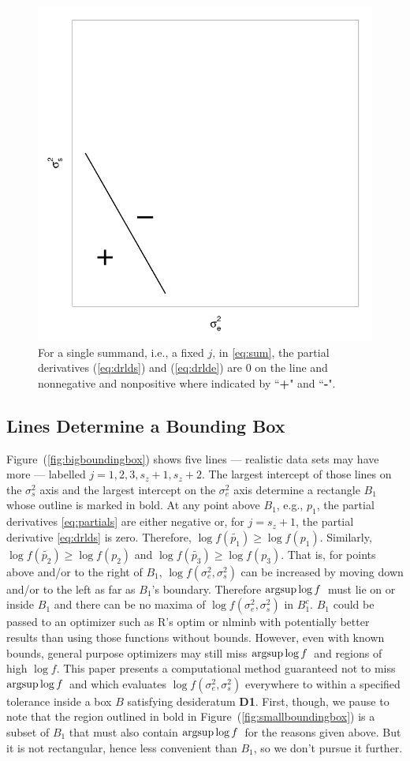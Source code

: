 \documentclass{report}
\newcommand{\textcompute}{\textsf}
\newcommand{\R}{\textcompute{R}\xspace}
\newcommand{\RL}{f}
\newcommand{\logRL}{\log\RL}
\newcommand{\sigssq}{\sigma_s^2}
\newcommand{\sigesq}{\sigma_e^2}
\newcommand{\logRLss}{\logRL(\sigesq,\sigssq)}
\newcommand{\mrle}{$\argsup\log f$}
\newcommand{\argsup}{\operatornamewithlimits{argsup}}
\begin{document}
\begin{figure}[h]
	\centering
	\includegraphics[width=.5\linewidth]{figs/oneline.pdf}
	\caption{For a single summand, i.e., a fixed $j$, in \eqref{eq:sum},
	              the partial derivatives (\ref{eq:drlds}) and (\ref{eq:drlde})
	              are 0 on the line and nonnegative and nonpositive
	              where indicated by ``\textbf{+}" and ``\textbf{-}".}
	\label{fig:oneline}
\end{figure}

\subsection{Lines Determine a Bounding Box}
\label{sec:boundingbox}

Figure~(\ref{fig:bigboundingbox}) shows five lines --- realistic data sets may have more --- labelled $j=1, 2, 3, s_z+1, s_z+2$.  The largest intercept of those lines on the $\sigssq$ axis and the largest intercept on the $\sigesq$ axis determine a rectangle $B_1$ whose outline is marked in bold.  At any point above $B_1$, e.g., $p_1$, the partial derivatives \eqref{eq:partials} are either negative or, for $j=s_z+1$, the partial derivative \eqref{eq:drlds} is zero.  Therefore, $\logRL(\widetilde{p_1}) \ge \logRL(p_1)$.  Similarly, $\logRL(\widetilde{p_2}) \ge \logRL(p_2)$ and $\logRL(\widetilde{p_3}) \ge \logRL(p_3)$.  That is, for points above and/or to the right of $B_1$, $\logRLss$ can be increased by moving down and/or to the left as far as $B_1$'s boundary.  Therefore \mrle\ must lie on or inside $B_1$ and there can be no maxima of $\logRLss$ in $B_1^c$.  $B_1$ could be passed to an optimizer such as \R's \textsf{optim} or \textsf{nlminb} with potentially better results than using those functions without bounds.  However, even with known bounds, general purpose optimizers may still miss \mrle\ and regions of high $\logRL$.  This paper presents a computational method guaranteed not to miss \mrle\ and which evaluates $\logRLss$ everywhere to within a specified tolerance inside a box $B$ satisfying desideratum \textbf{D1}.  First, though, we pause to note that the region outlined in bold in Figure~(\ref{fig:smallboundingbox}) is a subset of $B_1$ that must also contain \mrle\ for the reasons given above.  But it is not rectangular, hence less convenient than $B_1$, so we don't pursue it further.
\end{document}
